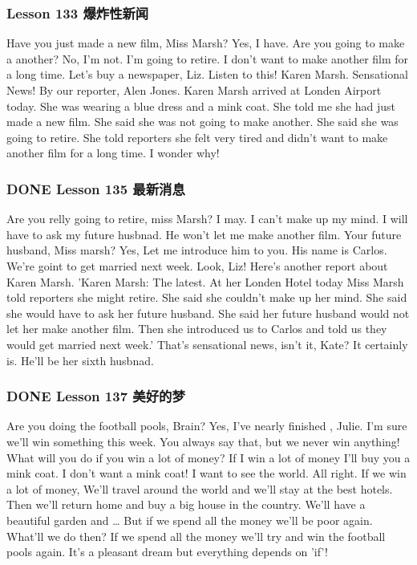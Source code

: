 \documentclass[11pt]{ctexart}
\begin{document}
\subsubsection{Lesson 133 爆炸性新闻}
\label{sec:org079ba38}
Have you just made a new film, Miss Marsh? Yes, I have.
Are you going to make a another? No, I'm not.
I'm going to retire.
I don't want to make another film for a long time.
Let's buy a newspaper, Liz.
Listen to this! Karen Marsh. Sensational News! By our reporter, Alen Jones.
Karen Marsh arrived at Londen Airport today.
She was wearing a blue dress and a mink coat.
She told me she had just made a new film.
She said she was not going to make another.
She said she was going to retire.
She told reporters she felt very tired and didn't want to make another film for a long time.
I wonder why!
\subsubsection{{\bfseries\sffamily DONE} Lesson 135 最新消息}
\label{sec:org1feca33}
Are you relly going to retire, miss Marsh?
I may.
I can't make up my mind.
I will have to ask my future husbnad.
He won't let me make another film.
Your future husband, Miss marsh?
Yes, Let me introduce him to you.
His name is Carlos.
We're goint to get married next week.
Look, Liz!
Here's another report about Karen Marsh.
'Karen Marsh: The latest.
At her Londen Hotel today Miss Marsh told reporters she might retire.
She said she couldn't make up her mind.
She said she would have to ask her future husband.
She said her future husband would not let her make another film.
Then she introduced us to Carlos and told us they would get married next week.'
That's sensational news, isn't it, Kate?
It certainly is.
He'll be her sixth husbnad.
\subsubsection{{\bfseries\sffamily DONE} Lesson 137 美好的梦}
\label{sec:org2129526}
Are you doing the football pools, Brain?
Yes, I've nearly finished , Julie.
I'm sure we'll win something this week.
You always say that, but we never win anything!
What will you do if you win a lot of money?
If I win a lot of money I'll buy you a mink coat.
I don't want a mink coat!
I want to see the world.
All right. If we win a lot of money,
We'll travel around the world and we'll stay at the best hotels.
Then we'll return home and buy a big house in the country.
We'll have a beautiful garden and …
But if we spend all the money we'll be poor again.
What'll we do then?
If we spend all the money we'll try and win the football pools again.
It's a pleasant dream but everything depends on 'if'!
\end{document}
